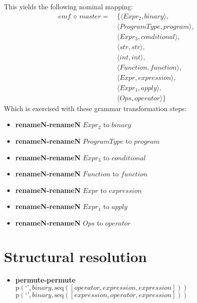 This yields the following nominal mapping:
\begin{align*}\mathit{emf} \:\diamond\: \mathit{master} =\:& \{\langle \mathit{Expr_2},\mathit{binary}\rangle,\\
 & \langle \mathit{ProgramType},\mathit{program}\rangle,\\
 & \langle \mathit{Expr_3},\mathit{conditional}\rangle,\\
 & \langle str,str\rangle,\\
 & \langle int,int\rangle,\\
 & \langle \mathit{Function},\mathit{function}\rangle,\\
 & \langle \mathit{Expr},\mathit{expression}\rangle,\\
 & \langle \mathit{Expr_1},\mathit{apply}\rangle,\\
 & \langle \mathit{Ops},\mathit{operator}\rangle\}\end{align*}
 Which is exercised with these grammar transformation steps:

{\footnotesize\begin{itemize}
\item \textbf{renameN-renameN} $\mathit{Expr_2}$ to $\mathit{binary}$
\item \textbf{renameN-renameN} $\mathit{ProgramType}$ to $\mathit{program}$
\item \textbf{renameN-renameN} $\mathit{Expr_3}$ to $\mathit{conditional}$
\item \textbf{renameN-renameN} $\mathit{Function}$ to $\mathit{function}$
\item \textbf{renameN-renameN} $\mathit{Expr}$ to $\mathit{expression}$
\item \textbf{renameN-renameN} $\mathit{Expr_1}$ to $\mathit{apply}$
\item \textbf{renameN-renameN} $\mathit{Ops}$ to $\mathit{operator}$
\end{itemize}}

\section{Structural resolution}
{\footnotesize\begin{itemize}
\item \textbf{permute-permute}\\$\mathrm{p}\left(\text{`'},\mathit{binary},\mathrm{seq}\left(\left[\mathit{operator}, \mathit{expression}, \mathit{expression}\right]\right)\right)$\\$\mathrm{p}\left(\text{`'},\mathit{binary},\mathrm{seq}\left(\left[\mathit{expression}, \mathit{operator}, \mathit{expression}\right]\right)\right)$
\end{itemize}}
